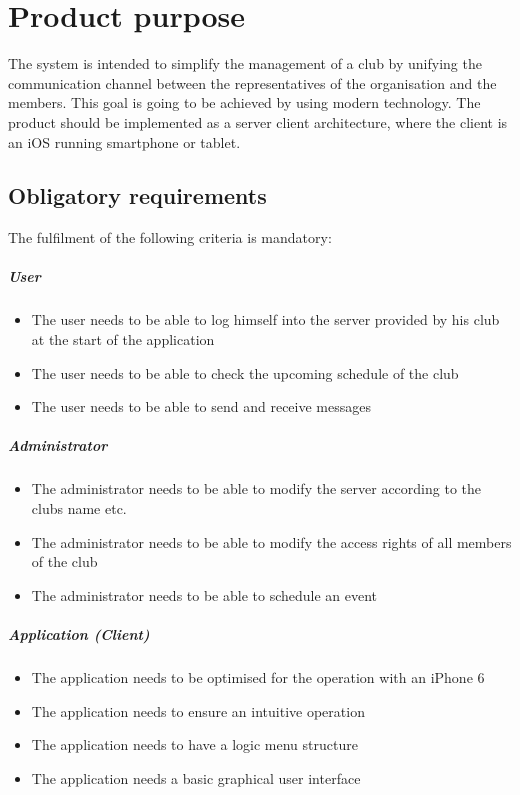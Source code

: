 \pagestyle{fancy}
\lhead{}
\renewcommand{\headrulewidth}{0pt}
\setlength{\headheight}{14pt}

\chapter{Product purpose}

The system is intended to simplify the management of a club by unifying the communication channel between the representatives of the organisation and the members. This goal is going to be achieved by using modern technology. The product should be implemented as a server client architecture, where the client is an iOS running smartphone or tablet.

\section{Obligatory requirements} %
The fulfilment of the following criteria is mandatory:

\paragraph{User}
\begin{itemize}
\item The user needs to be able to log himself into the server provided by his club at the start of the application
\item The user needs to be able to check the upcoming schedule of the club
\item The user needs to be able to send and receive messages
\end{itemize}

\paragraph{Administrator}
\begin{itemize}
\item The administrator needs to be able to modify the server according to the clubs name etc.
\item The administrator needs to be able to modify the access rights of all members of the club
\item The administrator needs to be able to schedule an event
\end{itemize}

\paragraph{Application (Client)}
\begin{itemize}
\item The application needs to be optimised for the operation with an iPhone 6
\item The application needs to ensure an intuitive operation
\item The application needs to have a logic menu structure
\item The application needs a basic graphical user interface
\end{itemize}

